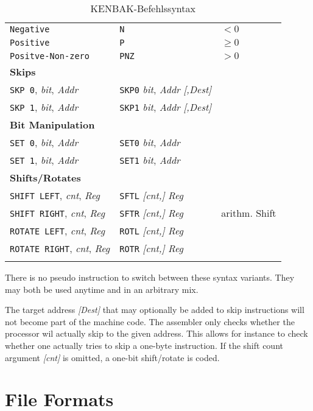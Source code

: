 \documentclass[12pt,twoside]{report}
\begin{document}
\begin{center}
\begin{longtable}{|l|l|l|}
{\tt Negative} & {\tt N} & $< 0$ \\
{\tt Positive} & {\tt P} & $\geq 0$ \\
{\tt Positve-Non-zero} & {\tt PNZ} & $ > 0$ \\
\hline
\multicolumn{3}{|l|}{\bf Skips} \\
\hline
{\tt SKP 0}, {\it bit}, {\it Addr} & {\tt SKP0} {\it bit}, {\it Addr} {\it [,Dest]} & \\
{\tt SKP 1}, {\it bit}, {\it Addr} & {\tt SKP1} {\it bit}, {\it Addr} {\it [,Dest]} & \\
\hline
\multicolumn{3}{|l|}{\bf Bit Manipulation} \\
\hline
{\tt SET 0}, {\it bit}, {\it Addr} & {\tt SET0} {\it bit}, {\it Addr} & \\
{\tt SET 1}, {\it bit}, {\it Addr} & {\tt SET1} {\it bit}, {\it Addr} & \\
\hline
\multicolumn{3}{|l|}{\bf Shifts/Rotates} \\
\hline
{\tt SHIFT LEFT}, {\it cnt}, {\it Reg} & {\tt SFTL} {\it [cnt,]} {\it Reg} & \\
{\tt SHIFT RIGHT}, {\it cnt}, {\it Reg} & {\tt SFTR} {\it [cnt,]} {\it Reg} & arithm. Shift \\
{\tt ROTATE LEFT}, {\it cnt}, {\it Reg} & {\tt ROTL} {\it [cnt,]} {\it Reg} & \\
{\tt ROTATE RIGHT}, {\it cnt}, {\it Reg} & {\tt ROTR} {\it [cnt,]} {\it Reg} & \\
\hline
\caption{KENBAK-Befehlssyntax \label{TabKENBAKSyntax}}
\end{longtable}\end{center}
\hfuzz=0pt

There is no pseudo instruction to switch between these syntax variants.  They may
both be used anytime and in an arbitrary mix.

The target address {\it [Dest]} that may optionally be added to skip instructions
will not become part of the machine code.  The assembler only checks whether the
processor wil actually skip to the given address.  This allows for instance to check
whether one actually tries to skip a one-byte instruction.  If the shift count
argument {\it [cnt]} is omitted, a one-bit shift/rotate is coded.


\cleardoublepage
\chapter{File Formats}
\end{document}
